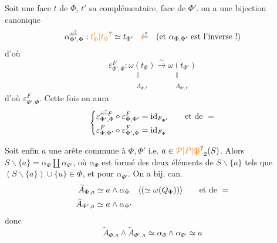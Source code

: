 Soit une face $t$ de $\Phi$, $t'$ sa complémentaire, face de $\Phi'$.
on a une bijection canonique
\[
\alpha^{\deleted{\unsure{S}}}_{\Phi',\Phi}:\unsure{t'_\Phi|t_\Phi}\simeq t_{\Phi'}\quad \deleted{\unsure{t}}\quad
\text{(et $\alpha_{\Phi,\Phi'}$ est l'inverse !)}
\]
d'où
\[
\varepsilon^F_{\Phi',\Phi}:
\underset{\substack{\Vert\\\widetilde A_{\Phi,t}}}{\omega(t_\Phi)}
\xrightarrow{\sim}\underset{\substack{\Vert\\\widetilde A_{\Phi',t'}}}{\omega(t_{\Phi'})}
\]
d'où $\varepsilon^F_{\Phi',\Phi}$. Cette fois on aura
\[
\left\{\begin{aligned}
\varepsilon^{\deleted{\unsure{S}}F}_{\Phi',\Phi}\circ\varepsilon^F_{\Phi,\Phi'}&=\mathrm{id}_{F_{\Phi'}}\qquad\text{et de }=\\
\varepsilon^F_{\Phi,\Phi'}\circ\varepsilon^F_{\Phi',\Phi}&=\mathrm{id}_{F_\Phi}
\end{aligned}\right.
\]

Soit enfin $a$ une arête commune à $\Phi,\Phi'$
i.e. $a\in\unsure{\mathcal P|P|\mathfrak P}_2(S)$. Alors $S\smallsetminus\{a\}=\alpha_\Phi\amalg\alpha_{\Phi'}$, où $\alpha_\Phi$ est
formé des deux éléments  de $S\smallsetminus\{a\}$ tels que
$(S\smallsetminus\{a\})\cup\{u\}\in\Phi$, et  pour $\alpha_{\Phi'}$. On a bij. can.
\[
\begin{aligned}
\widetilde A_{\Phi,a}&\simeq a\wedge\alpha_\Phi\quad\inserted{(\simeq\omega(Q_\Phi))}\qquad\text{et de }=\\
\widetilde A_{\Phi',a}&\simeq a\wedge\alpha_{\Phi'}
\end{aligned}
\]
donc
\[
\widetilde A_{\Phi,a}\wedge\widetilde A_{\Phi',a}\simeq\alpha_\Phi\wedge\alpha_{\Phi'}\simeq a
\]

